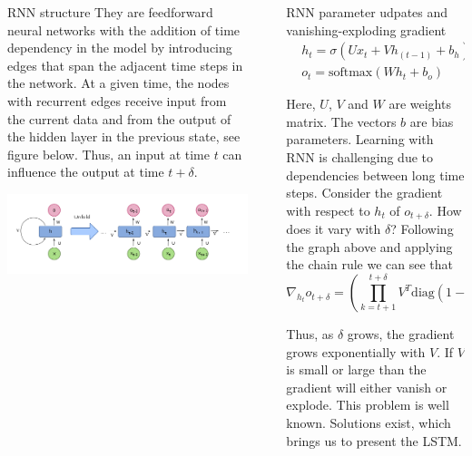 \documentclass[final]{beamer}
\newlength{\sepwidth}
\newlength{\colwidth}
\newcommand{\separatorcolumn}{\begin{column}{\sepwidth}\end{column}}
\begin{document}
\begin{frame}[t]
\begin{columns}[t]
\begin{column}{\colwidth}
\begin{block}{RNN structure}
They are feedforward neural networks with the addition of time dependency in
the model by introducing edges that span the adjacent time steps in the
network. At a given time, the nodes with recurrent edges receive input from the
current data and from the output of the hidden layer in the previous state, see
figure below. Thus, an input at time $t$ can influence the output at time $t + \delta$.
\begin{center}
    \includegraphics[width = 0.9\linewidth]{RNN.png}
\end{center}
\end{block}



\end{column}

\separatorcolumn

\begin{column}{\colwidth}

\begin{block}{RNN parameter udpates and vanishing-exploding gradient}
\begin{align*}
    &h_t = \sigma(U x_t + V h_{(t-1)} + b_h)\text{,}\\
    &o_t = \text{softmax}(W h_t + b_o)
\end{align*}

Here, $ U$, $V$ and $W$ are weights matrix. The vectors $b$ are bias
parameters. Learning with RNN is challenging due to dependencies between long
time steps. Consider the gradient with respect to $h_t$ of $o_{t + \delta}$.
How does it vary with $\delta$? Following the graph above and applying the
chain rule we can see that
\begin{equation*}
  \nabla_{h_t} o_{t + \delta} = \left( \prod_{k = t+1}^{t+\delta} V^T
  \text{diag}(1 - h^2_k) \right)\nabla_{h_{t + \delta}}o_{t + \delta}.
\end{equation*}

Thus, as $\delta$ grows, the gradient grows exponentially with $V$. If $V$ is
small or large than the gradient will either vanish or explode. This problem is
well known. Solutions exist, which brings us to present the LSTM.


\end{block}
\end{column}
\end{columns}
\end{frame}
\end{document}

